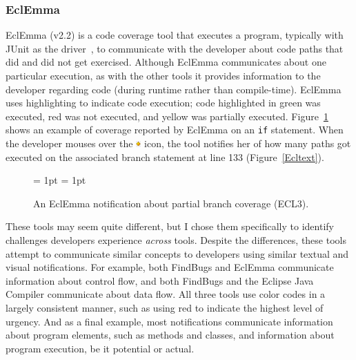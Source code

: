 \subsubsection*{EclEmma}

EclEmma (v2.2) is a code coverage tool that executes a program, typically with JUnit
as the driver~\cite{JUnit}, to communicate with the developer about code paths that did and
did not get exercised. Although EclEmma communicates about one particular execution, 
as with the other tools it provides information to the developer regarding code 
(during runtime rather than compile-time). 
EclEmma uses highlighting to indicate code execution; code highlighted in
green was executed, red was not executed, and yellow was partially executed.
Figure~\ref{fig:notificationECL} shows an example of coverage reported by
EclEmma on an \texttt{if} statement. When the developer mouses over the
\includegraphics[height=9px]{Chapter-4/figs/diamond} icon, the tool notifies her of how many
paths got executed on the associated branch statement at line 133
(Figure~\ref{Ecltext}).

\begin{figure} [t]
\subfigcapskip = 1pt
\centering
{}
\subfigcapskip = 1pt

\caption{An EclEmma notification about partial branch coverage (ECL3).}
\label{fig:notificationECL}
\end{figure} 

These tools may seem quite different, but I chose them
specifically to identify challenges developers experience \emph{across} tools.
Despite the differences, these tools attempt to communicate similar concepts to developers using similar textual and visual notifications.
For example, both FindBugs and EclEmma communicate information about 
control flow, and both FindBugs and the Eclipse Java Compiler communicate about data flow.
All three tools use color codes in a largely consistent manner, 
such as using red to indicate the highest level of urgency.
And as a final example, most notifications communicate information about program elements, such as methods and classes, and information about program execution, be it potential or actual.


